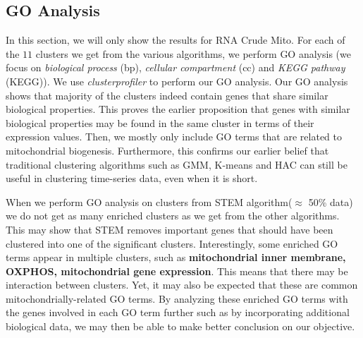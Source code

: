 \subsection{GO Analysis}
In this section, we will only show the results for RNA Crude Mito. For each of the $11$ clusters we get from the various algorithms, we perform GO analysis (we focus on \textit{biological process} (bp), \textit{cellular compartment} (cc) and \textit{KEGG pathway} (KEGG)). We use \textit{clusterprofiler} \cite{clusterprofiler} to perform our GO analysis. Our GO analysis shows that majority of the clusters indeed contain genes that share similar biological properties. This proves the earlier proposition that genes with similar biological properties may be found in the same cluster in terms of their expression values. Then, we mostly only include GO terms that are related to mitochondrial biogenesis. Furthermore, this confirms our earlier belief that traditional clustering algorithms such as GMM, K-means and HAC can still be useful in clustering time-series data, even when it is short.

When we perform GO analysis on clusters from STEM algorithm($\approx$ 50\% data) we do not get as many enriched clusters as we get from the other algorithms. This may show that STEM removes important genes that should have been clustered into one of the significant clusters. Interestingly, some enriched GO terms appear in multiple clusters, such as \textbf{mitochondrial inner membrane, OXPHOS, mitochondrial gene expression}. This means that there may be interaction between clusters. Yet, it may also be expected that these are common mitochondrially-related GO terms. By analyzing these enriched GO terms with the genes involved in each GO term further such as by incorporating additional biological data, we may then be able to make better conclusion on our objective. 

